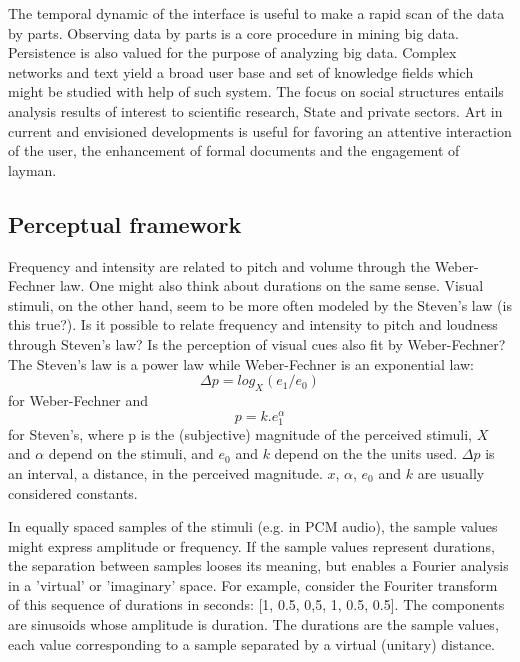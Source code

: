 \documentclass[letterpaper,10pt]{article}
\begin{document}
The temporal dynamic of the interface is useful to make a rapid scan of the data by parts.
Observing data by parts is a core procedure in mining big data.
Persistence is also valued for the purpose of analyzing big data.
Complex networks and text yield a broad user base
and set of knowledge fields which might be studied with help of such system.
The focus on social structures entails analysis results of interest
to scientific research, State and private sectors.
Art in current and envisioned developments
is useful for favoring an attentive interaction of the user,
the enhancement of formal documents and the engagement
of layman.

\subsection{Perceptual framework}
Frequency and intensity are related to pitch and volume
through the Weber-Fechner law.
One might also think about durations on the same sense.
Visual stimuli, on the other hand, seem to be 
more often modeled by the Steven's law (is this true?).
Is it possible to relate frequency and intensity to
pitch and loudness through Steven's law?
Is the perception of visual cues also fit by Weber-Fechner?
The Steven's law is a power law while Weber-Fechner is an exponential
law:
\begin{equation}
	\Delta p = log_X(e_1/e_0)
\end{equation}
\noindent for Weber-Fechner and
\begin{equation}
	p = k.e_1^\alpha
\end{equation}
\noindent for Steven's,
where p is the (subjective) magnitude of the perceived stimuli,
$X$ and $\alpha$ depend on the stimuli,
and $e_0$ and $k$ depend on the the units used.
$\Delta p$ is an interval, a distance, in the perceived magnitude.
$x$, $\alpha$, $e_0$ and $k$ are usually considered constants.

In equally spaced samples of the stimuli (e.g. in PCM audio),
the sample values might express amplitude or frequency.
If the sample values represent durations, the separation
between samples looses its meaning, but enables a Fourier
analysis in a 'virtual' or 'imaginary' space.
For example, consider the Fouriter transform of
this sequence of durations in seconds:
[1, 0.5, 0,5, 1, 0.5, 0.5].
The components are sinusoids whose amplitude
is duration.
The durations are the sample values,
each value corresponding to a sample separated
by a virtual (unitary) distance.
\end{document}
